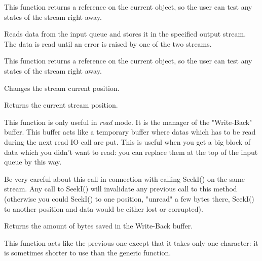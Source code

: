 This function returns a reference on the current object, so the user can test
any states of the stream right away.


Reads data from the input queue and stores it in the specified output stream.
The data is read until an error is raised by one of the two streams.


This function returns a reference on the current object, so the user can test
any states of the stream right away.



Changes the stream current position.



Returns the current stream position.

\label{wxinputstream_ungetch}


This function is only useful in {\it read} mode. It is the manager of the "Write-Back"
buffer. This buffer acts like a temporary buffer where datas which has to be
read during the next read IO call are put. This is useful when you get a big
block of data which you didn't want to read: you can replace them at the top
of the input queue by this way.

Be very careful about this call in connection with calling SeekI() on the same
stream. Any call to SeekI() will invalidate any previous call to this method
(otherwise you could SeekI() to one position, "unread" a few bytes there, SeekI()
to another position and data would be either lost or corrupted).


Returns the amount of bytes saved in the Write-Back buffer.


This function acts like the previous one except that it takes only one
character: it is sometimes shorter to use than the generic function.

